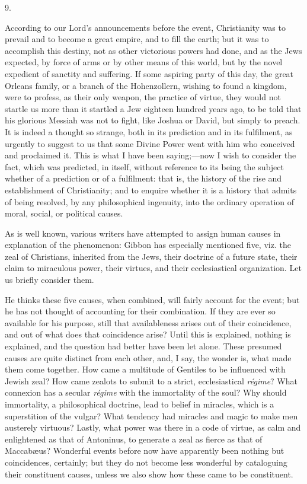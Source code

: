 9.

According to our Lord's announcements before the event,
Christianity was to prevail and to become a great empire, and to fill
the earth; but it was to accomplish this destiny, not as other
victorious powers had done, and as the Jews expected, by force of arms
or by other means of this world, but by the novel expedient of
sanctity and suffering. If some aspiring party of this day, the great
Orleans family, or a branch of the Hohenzollern, wishing to found a
kingdom, were to profess, as their only weapon, the practice of
virtue, they would not startle us more than it startled a Jew
eighteen hundred years ago, to be told that his glorious Messiah was
not to fight, like Joshua or David, but simply to preach. It is indeed
a thought so strange, both in its prediction and in its fulfilment, as
urgently to suggest to us that some Divine Power went with him who
conceived and proclaimed it. This is what I have been saying;—now I
wish to consider the fact, which was predicted, in itself, without
reference to its being the subject whether of a prediction or of a
fulfilment: that is, the history of the rise and establishment of
Christianity; and to enquire whether it is a history that admits of
being resolved, by any philosophical ingenuity, into the ordinary
operation of moral, social, or political causes.

As is well known, various writers have attempted to assign human
causes in explanation of the phenomenon: Gibbon has especially
mentioned five, viz. the zeal of Christians, inherited from the Jews,
their doctrine of a future state, their claim to miraculous power,
their virtues, and their ecclesiastical organization. Let us briefly
consider them.

He thinks these five causes, when combined, will fairly account for
the event; but he has not thought of accounting for their combination.
If they are ever so available for his purpose, still that
availableness arises out of their coincidence, and out of what does
that coincidence arise? Until this is explained, nothing is explained,
and the question had better have been let alone. These presumed causes
are quite distinct from each other, and, I say, the wonder is, what
made them come together. How came a multitude of Gentiles to be
influenced with Jewish zeal? How came zealots to submit to a strict,
ecclesiastical \emph{régime}? What connexion has a secular \emph{régime}
with the immortality of the soul? Why should immortality, a
philosophical doctrine, lead to belief in miracles, which is a
superstition of the vulgar? What tendency had miracles and magic to
make men austerely virtuous? Lastly, what power was there in a code of
virtue, as calm and enlightened as that of Antoninus, to generate a
zeal as fierce as that of Maccabæus? Wonderful events before now have
apparently been nothing but coincidences, certainly; but they do not
become less wonderful by cataloguing their constituent causes, unless
we also show how these came to be constituent.

